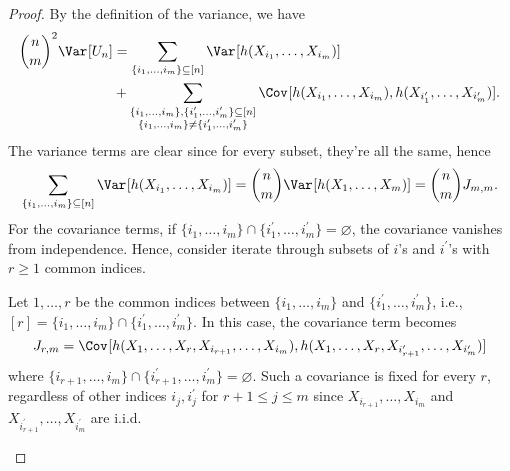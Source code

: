 \begin{proof}
	By the definition of the variance, we have
	\[
		\begin{split}
			\binom{n}{m}^2 \Var_{}[U_n]
			 & = \sum_{\{ i_1, \dots , i_m \} \subseteq [n]} \Var_{}[h(X_{i_1}, \dots , X_{i_m})]                 \\
			 & + \sum_{\substack{\{ i_1, \dots , i_m \} , \{ i_1^{\prime} , \dots , i_m^{\prime} \} \subseteq [n] \\ \{ i_1 , \dots , i_m \} \neq \{ i_1^{\prime} , \dots , i_m^{\prime} \}}} \Cov_{}[h(X_{i_1}, \dots , X_{i_m}), h(X_{i_1^{\prime} }, \dots , X_{i_m^{\prime} })].
		\end{split}
	\]
	The variance terms are clear since for every subset, they're all the same, hence
	\[
		\sum_{\{ i_1, \dots , i_m \} \subseteq [n]} \Var_{}[h(X_{i_1}, \dots , X_{i_m})]
		= \binom{n}{m} \Var_{}[h(X_1, \dots , X_m)]
		= \binom{n}{m} J_{m, m}.
	\]
	For the covariance terms, if \(\{ i_1, \dots , i_m \} \cap \{ i_1^{\prime} , \dots , i_m^{\prime}  \} = \varnothing \), the covariance vanishes from independence. Hence, consider iterate through subsets of \(i\)'s and \(i^{\prime} \)'s with \(r \geq 1\) common indices.

	\begin{intuition}
		Let \(1, \dots , r\) be the common indices between \(\{i_1, \dots , i_m \} \) and \(\{ i_1^{\prime} , \dots , i_m^{\prime} \} \), i.e., \([r] = \{i_1, \dots , i_m \} \cap \{ i_1^{\prime} , \dots , i_m^{\prime} \}\). In this case, the covariance term becomes
		\[
			J_{r, m}
			= \Cov_{}[h(X_1, \dots , X_r, X_{i_{r+1}}, \dots , X_{i_m}), h(X_1, \dots , X_r, X_{i_{r+1}^{\prime} }, \dots , X_{i_m^{\prime} })]
		\]
		where \(\{ i_{r+1} , \dots , i_m \} \cap \{ i_{r+1}^{\prime} , \dots , i_m^{\prime} \} = \varnothing \). Such a covariance is fixed for every \(r\), regardless of other indices \(i_j , i_j^{\prime} \) for \(r+1 \leq j \leq m\) since \(X_{i_{r+1}}, \dots , X_{i_m}\) and \(X_{i_{r+1}^{\prime} }, \dots , X_{i_m^{\prime} }\) are i.i.d.
	\end{intuition}


\end{proof}
